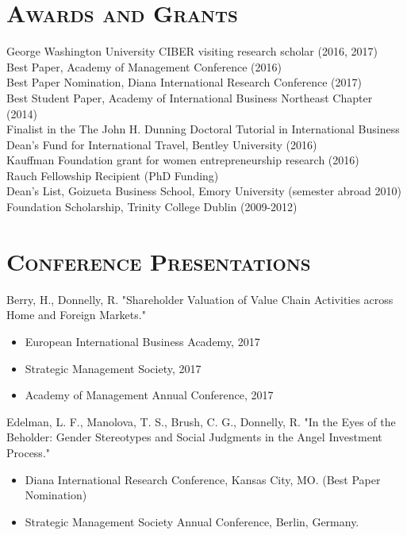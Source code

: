 \documentclass[margin, 12pt]{res}
\begin{document}
\begin{resume}
\section{\normalfont\textsc{Awards and Grants}}
George Washington University CIBER visiting research scholar (2016, 2017) \\[0.2em]
Best Paper, Academy of Management Conference (2016)\\[0.2em]
Best Paper Nomination, Diana International Research Conference (2017)\\[0.2em]
Best Student Paper, Academy of International Business Northeast Chapter (2014)\\[0.2em]
Finalist in the The John H. Dunning Doctoral Tutorial in International Business \\ [0.2em]
Dean's Fund for International Travel, Bentley University (2016) \\
[0.2em]
Kauffman Foundation grant for women entrepreneurship research (2016) \\
[0.2em]
Rauch Fellowship Recipient (PhD Funding) \\
[0.2em]
Dean's List, Goizueta Business School, Emory University (semester abroad 2010)
Foundation Scholarship, Trinity College Dublin (2009-2012) 





\section{\normalfont\textsc{Conference Presentations}}
Berry, H., Donnelly, R. "Shareholder Valuation of Value Chain Activities across Home and Foreign Markets." 
\begin{itemize}
\item European International Business Academy, 2017
\item Strategic Management Society, 2017
\item Academy of Management Annual Conference, 2017
\end{itemize}
\vspace{-0.25cm}
Edelman, L. F., Manolova, T. S., Brush, C. G., Donnelly, R.  "In the Eyes of the Beholder: Gender Stereotypes and Social Judgments in the Angel Investment Process." 
\begin{itemize}

\item  Diana International Research Conference, Kansas City, MO. (Best Paper Nomination)
\item Strategic Management Society Annual Conference, Berlin, Germany. 
\end{itemize}


\end{resume}
\end{document}
